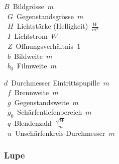 \begin{center}
	\begin{minipage}{0.3\textwidth}
		\unit{$ B $}{Bildgrösse}{$ m $} \\
		\unit{$ G $}{Gegenstandsgrösse}{$ m $} \\
		\unit{$ H $}{Lichtstärke (Helligkeit)}{$ \frac{W}{m^2} $} \\
		\unit{$ I $}{Lichtstrom}{$ W $} \\
		\unit{$ Z $}{Öffnungsverhältnis}{$ 1 $} \\
		\unit{$ b $}{Bildweite}{$ m $} \\
		\unit{$ b_0 $}{Filmweite}{$ m $} \\
	\end{minipage}%
	\begin{minipage}{0.3\textwidth}
		\unit{$ d $}{Durchmesser Eintrittspupille}{$ m $} \\
		\unit{$ f $}{Brennweite}{$ m $} \\
		\unit{$ g $}{Gegenstandsweite}{$ m $} \\
		\unit{$ g_0 $}{Schärfentiefenbereich}{$ m $} \\
		\unit{$ q $}{Blendenzahl}{$ \frac{\sqrt{W}}{m} $} \\
		\unit{$ u $}{Unschärfenkreis-Durchmesser}{$ m $} \\
	\end{minipage}
\end{center}




\subsubsection{Lupe}

